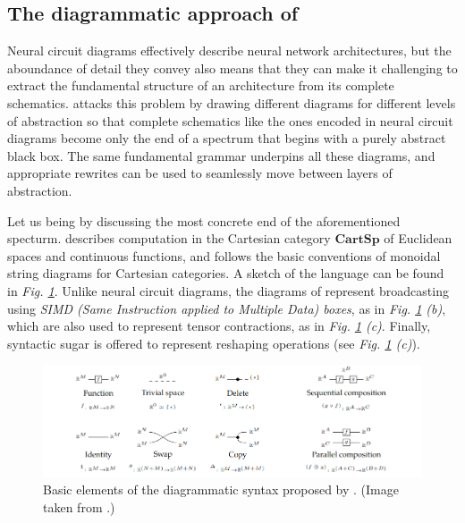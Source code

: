 \documentclass[11pt,a4paper,openright,twoside]{report}
\theoremstyle{plain}
\theoremstyle{definition}
\begin{document}
\subsection{The diagrammatic approach of \cite{khatri2024anatomy}}



Neural circuit diagrams effectively describe neural network architectures, but the aboundance of detail they convey also means that they can make it challenging to extract the fundamental structure of an architecture from its complete schematics.
\cite{khatri2024anatomy} attacks this problem by drawing different diagrams for different levels of abstraction so that complete schematics like the ones encoded in neural circuit diagrams become only the end of a spectrum that begins with a purely abstract black box. The same fundamental grammar underpins all these diagrams, and appropriate rewrites can be used to seamlessly move between layers of abstraction. 

Let us being by discussing the most concrete end of the aforementioned specturm. \cite{khatri2024anatomy} describes computation in the Cartesian category $\mathbf{CartSp}$ of Euclidean spaces and continuous functions, and follows the basic conventions of monoidal string diagrams for Cartesian categories. A sketch of the language can be found in \textit{Fig. \ref{fig: khatribasicdiagrams}}. Unlike neural circuit diagrams, the diagrams of \cite{khatri2024anatomy} represent broadcasting using \textit{SIMD (Same Instruction applied to Multiple Data) boxes}, as in \textit{Fig. \ref{fig: khatribasicdiagrams} (b)}, which are also used to represent tensor contractions, as in \textit{Fig. \ref{fig: khatribasicdiagrams} (c)}. Finally, syntactic sugar is offered to represent reshaping operations (see \textit{Fig. \ref{fig: khatribasicdiagrams} (c)}).

\begin{figure}[h]
  \begin{center}
    \includegraphics[width=\textwidth]{figures/khatri_diagrams.png}
    \caption[Diagrammatic syntax of \cite{khatri2024anatomy}]{Basic elements of the diagrammatic syntax proposed by \cite{khatri2024anatomy}. (Image taken from \cite{khatri2024anatomy}.)}
    \label{fig: khatribasicdiagrams}
  \end{center}
\end{figure}
\end{document}
